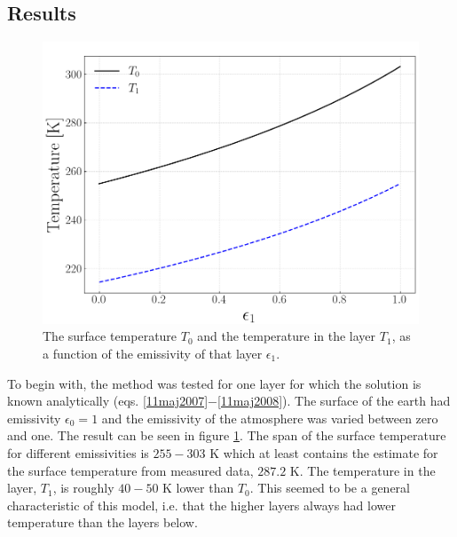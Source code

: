 \documentclass[twocolumn]{article}
\begin{document}
\begin{large}
\subsection*{Results}
\begin{figure}[!b]
    \begin{center}
        \includegraphics[scale=0.35]{OneLayer.png}
    \end{center}
    \caption{The surface temperature $T_0$ and the temperature in the layer $T_1$, as a function of the emissivity of that layer $\epsilon_1$.}
    \label{9maj1827}
\end{figure}
To begin with, the method was tested for one layer for which the solution is known analytically (eqs. \eqref{11maj2007}$-$\eqref{11maj2008}). The surface of the earth had emissivity $\epsilon_0=1$ and the emissivity of the atmosphere was varied between zero and one. The result can be seen in figure \ref{9maj1827}. The span of the surface temperature for different emissivities is $255-303$ K which at least contains the estimate for the surface temperature from measured data, $287.2$ K. The temperature in the layer, $T_1$, is roughly $40-50$ K lower than $T_0$. This seemed to be a general characteristic of this model, i.e. that the higher layers always had lower temperature than the layers below. 
\begin{figure}[!t]
    \begin{center}

\end{center}
\end{figure}
\end{large}
\end{document}
